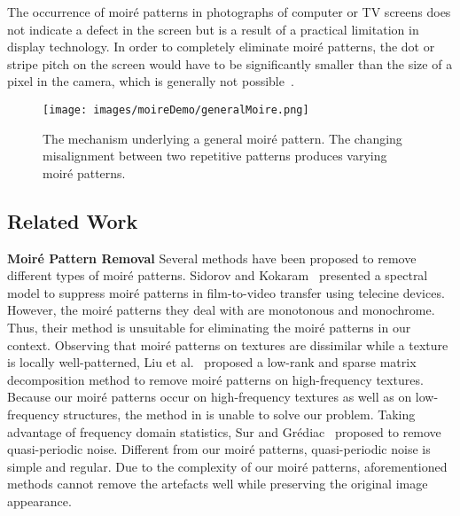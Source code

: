 \documentclass[journal]{IEEEtran}
\begin{document}
The occurrence of moir\'{e} patterns in photographs of computer or TV screens does not indicate a defect in the screen but is a result of a practical limitation in display technology. In order to completely eliminate moir\'{e} patterns, the dot or stripe pitch on the screen would have to be significantly smaller than the size of a pixel in the camera, which is generally not possible~\cite{keohi}.



\begin{figure}[t]
\begin{center}
 \texttt{[image: images/moireDemo/generalMoire.png]}
\end{center}
 \caption{The mechanism underlying a general moir\'{e} pattern. The changing misalignment between two repetitive patterns produces varying moir\'{e} patterns.}
\label{fig:generalMoireDemo}
\end{figure}


\subsection{Related Work}
\textbf{Moir\'{e} Pattern Removal} Several methods have been proposed to remove different types of moir\'{e} patterns. Sidorov and Kokaram~\cite{sidorov2002suppression} presented a spectral model to suppress moir\'{e} patterns in film-to-video transfer using telecine devices. However, the moir\'{e} patterns they deal with are monotonous and monochrome. Thus, their method is unsuitable for eliminating the moir\'{e} patterns in our context. Observing that moir\'{e} patterns on textures are dissimilar while a texture is locally well-patterned, Liu et al.~\cite{liu2015moire} proposed a low-rank and sparse matrix decomposition method to remove moir\'{e} patterns on high-frequency textures. Because our moir\'{e} patterns occur on high-frequency textures as well as on low-frequency structures, the method in \cite{liu2015moire} is unable to solve our problem. Taking advantage of frequency domain statistics, Sur and Gr\'{e}diac~\cite{sur2015automated} proposed to remove quasi-periodic noise. Different from our moir\'{e} patterns, quasi-periodic noise is simple and regular. Due to the complexity of our moir\'{e} patterns, aforementioned methods cannot remove the artefacts well while preserving the original image appearance.
\end{document}
